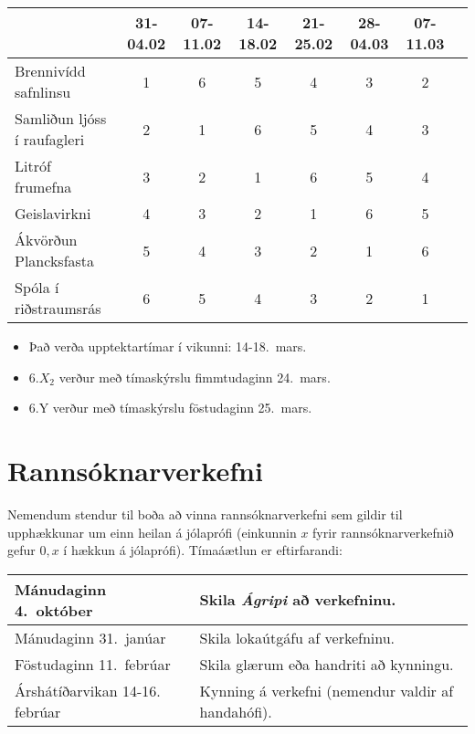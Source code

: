 \begin{table}[H]
    \centering
    \begin{tabular}{|l||c|c|c|c|c|c|c|}
    \hline 
         & 31-04.02 & 07-11.02 & 14-18.02 & 21-25.02 & 28-04.03 & 07-11.03   \\ \hline \hline
        Brennivídd safnlinsu & 1 & 6  & 5 & 4 & 3 & 2   \\ \hline
        Samliðun ljóss í raufagleri & 2 & 1 & 6 & 5 & 4 & 3 \\ \hline
        Litróf frumefna & 3 & 2 & 1 & 6 & 5 & 4 \\ \hline
        Geislavirkni & 4 & 3 & 2 & 1 & 6  & 5  \\ \hline
        Ákvörðun Plancksfasta & 5 & 4 & 3 & 2 & 1 & 6   \\ \hline
        Spóla í riðstraumsrás & 6 & 5 & 4 & 3 & 2 & 1  \\ \hline
    \end{tabular}
\end{table}


\begin{itemize}
    \item Það verða upptektartímar í vikunni: 14-18.~mars.
    \item 6.$X_2$ verður með tímaskýrslu fimmtudaginn 24.~mars.
    \item 6.Y verður með tímaskýrslu föstudaginn 25.~mars.
\end{itemize}

\newpage

\section*{Rannsóknarverkefni}

Nemendum stendur til boða að vinna rannsóknarverkefni sem gildir til upphækkunar um einn heilan á jólaprófi (einkunnin $x$ fyrir rannsóknarverkefnið gefur $0,x$ í hækkun á jólaprófi). Tímaáætlun er eftirfarandi:


\begin{table}[H]
    \centering
    \begin{tabular}{|l|l|}
    \hline
        Mánudaginn 4.~október & Skila \emph{Ágripi} að verkefninu.  \\ \hline
        Mánudaginn 31.~janúar & Skila lokaútgáfu af verkefninu. \\ \hline
        Föstudaginn 11.~febrúar & Skila glærum eða handriti að kynningu. \\ \hline
        Árshátíðarvikan 14-16. febrúar & Kynning á verkefni (nemendur valdir af handahófi). \\ \hline
    \end{tabular}
\end{table}

